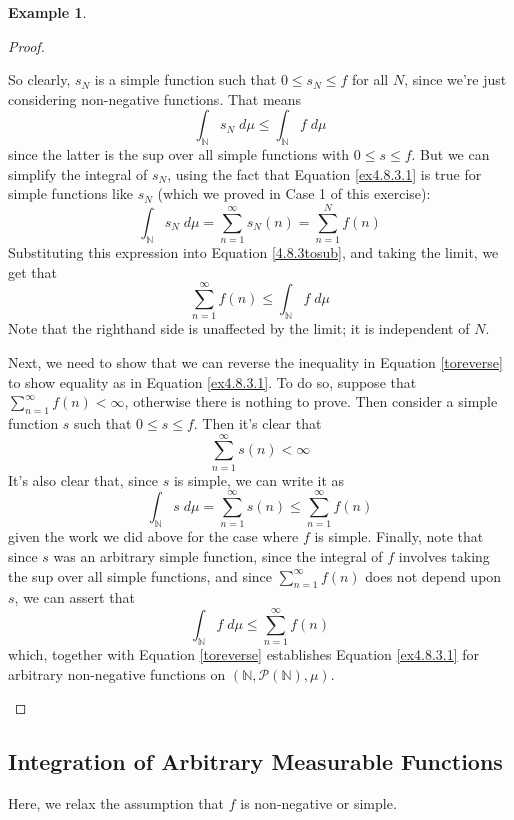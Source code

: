 \documentclass[12pt]{article}
\theoremstyle{plain}
\theoremstyle{definition}
\newtheorem{ex}[thm]{Example}
\theoremstyle{remark}
\begin{document}
\begin{ex}
\begin{proof}
\begin{enumerate}
So clearly, $s_N$ is a simple function such that $0\leq s_N \leq f$ for all $N$, since we're just considering non-negative functions. That means
\begin{equation}
    \label{4.8.3tosub}
    \int_\mathbb{N} s_N \;d\mu \leq
    \int_\mathbb{N} f \;d\mu 
\end{equation}
since the latter is the sup over all simple functions with $0\leq s\leq f$. But we can simplify the integral of $s_N$, using the fact that Equation \ref{ex4.8.3.1} is true for simple functions like $s_N$ (which we proved in Case 1 of this exercise):
    \[
        \int_\mathbb{N} s_N \;d\mu = \sum^\infty_{n=1}s_N(n) 
        = \sum^N_{n=1} f(n)
    \]
Substituting this expression into Equation \ref{4.8.3tosub}, and taking the limit, we get that 
\begin{equation}
    \label{toreverse}
    \sum^\infty_{n=1} f(n) \leq \int_\mathbb{N} f\; d\mu 
\end{equation}
Note that the righthand side is unaffected by the limit; it is independent of $N$.

Next, we need to show that we can reverse the inequality in Equation \ref{toreverse} to show equality as in Equation \ref{ex4.8.3.1}. To do so, suppose that $\sum^\infty_{n=1} f(n)<\infty$, otherwise there is nothing to prove. Then consider a simple function $s$ such that $0\leq s \leq f$. Then it's clear that 
\[
    \sum^\infty_{n=1} s(n)<\infty
\]
It's also clear that, since $s$ is simple, we can write it as
\[
    \int_\mathbb{N} s \; d\mu = \sum^\infty_{n=1} s(n)
    \leq \sum^\infty_{n=1} f(n)
\]
given the work we did above for the case where $f$ is simple. Finally, note that since $s$ was an arbitrary simple function, since the integral of $f$ involves taking the sup over all simple functions, and since $\sum^\infty_{n=1}f(n)$ does not depend upon $s$, we can assert that
\[
    \int_\mathbb{N} f \; d\mu \leq \sum^\infty_{n=1} f(n)
\]
which, together with Equation \ref{toreverse} establishes Equation \ref{ex4.8.3.1} for arbitrary non-negative functions on $(\mathbb{N}, \mathscr{P}(\mathbb{N}), \mu)$.
\end{enumerate}
\end{proof}
\end{ex}


\subsection{Integration of Arbitrary Measurable Functions}

Here, we relax the assumption that $f$ is non-negative or simple.
\end{document}
